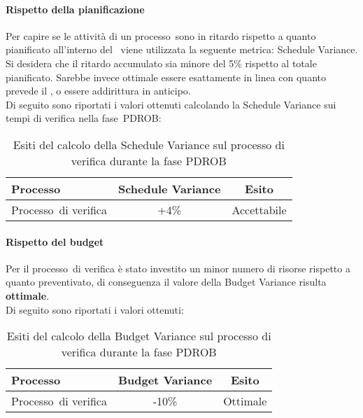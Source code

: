 \documentclass[../PianoDiQualifica.tex]{subfiles}
\begin{document}
\begin{appendices}
			\paragraph{Rispetto della pianificazione}
			Per capire se le attività di un processo\g\ sono in ritardo rispetto a quanto pianificato all'interno del \pianodiprogetto\ viene utilizzata la seguente metrica: Schedule Variance.\\
			Si desidera che il ritardo accumulato sia minore del 5\% rispetto al totale pianificato. Sarebbe invece ottimale essere esattamente in linea con quanto prevede il \pianodiprogetto, o essere addirittura in anticipo.\\
			Di seguito sono riportati i valori ottenuti calcolando la Schedule Variance sui tempi di verifica nella fase\g\ PDROB:
			\begin{table}[H]
				\centering
				\begin{tabular}{l * {2}{c}}
					\toprule
					\textbf{Processo} & \textbf{Schedule Variance} & \textbf{Esito} \\
					\midrule
					Processo\g\ di verifica & +4\% &  Accettabile \\
					\bottomrule
				\end{tabular}
				\caption{Esiti del calcolo della Schedule Variance sul processo di verifica durante la fase PDROB}
				\label{tab:esiti_schedule_variance}
			\end{table}
			
			\paragraph{Rispetto del budget}
			Per il processo\g\ di verifica è stato investito un minor numero di risorse rispetto a quanto preventivato, di conseguenza il valore della Budget Variance risulta \textbf{ottimale}.\\
			Di seguito sono riportati i valori ottenuti:
			\begin{table}[H]
				\centering
				\begin{tabular}{l * {2}{c}}
					\toprule
					\textbf{Processo} & \textbf{Budget Variance} & \textbf{Esito} \\
					\midrule
					Processo\g\ di verifica & -10\% &  Ottimale \\
					\bottomrule
				\end{tabular}
				\caption{Esiti del calcolo della Budget Variance sul processo di verifica durante la fase PDROB}
				\label{tab:esiti_budget_variance}
			\end{table}
			

\end{appendices}
\end{document}
